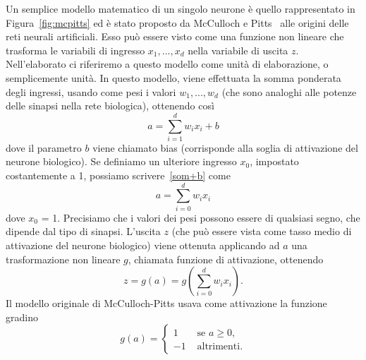 \documentclass[11pt,a4paper,twoside,
openright]{book}
\begin{document}
Un semplice modello matematico di un singolo neurone è quello rappresentato in Figura~\ref{fig:mcpitts} ed è stato proposto da McCulloch e Pitts~\cite{McCulloch:1943aa} alle origini delle reti neurali artificiali. Esso può essere visto come una funzione non lineare che trasforma le variabili di ingresso $x_{1}, ..., x_{d}$ nella variabile di uscita $z$. Nell’elaborato ci riferiremo a questo modello come unità di elaborazione, o semplicemente unità.
In questo modello, viene effettuata la somma ponderata degli ingressi, usando come pesi i valori $w_{1}, ..., w_{d}$ (che sono analoghi alle potenze delle sinapsi nella rete biologica), ottenendo così
\begin{equation}
a = \sum\limits_{i=1}^d w_{i}x_{i}+b
\label{som+b}
\end{equation}
dove il parametro $b$ viene chiamato bias (corrisponde alla soglia di attivazione del neurone biologico). Se definiamo un ulteriore ingresso $x_{0}$, impostato costantemente a 1, possiamo scrivere~\eqref{som+b} come
\begin{equation}
a = \sum\limits_{i=0}^d w_{i}x_{i}
\label{som}
\end{equation}
dove $x_{0}$ = 1. Precisiamo che i valori dei pesi possono essere di qualsiasi segno, che dipende dal tipo di sinapsi. L’uscita $z$ (che può essere vista come tasso medio di attivazione del neurone biologico) viene ottenuta applicando ad $a$ una trasformazione non lineare $g$, chiamata funzione di attivazione, ottenendo 
\begin{equation}
z=g(a)=g\left( \sum\limits_{i=0}^d w_{i}x_{i} \right).
\label{act+som}
\end{equation}
Il modello originale di McCulloch-Pitts usava come attivazione la funzione gradino
\begin{equation}
g(a)=
\begin{cases}
1 &\text{ se } a\geq0, \\
-1 &\text{ altrimenti}.
\end{cases}
\label{act+som}
\end{equation}
\end{document}
